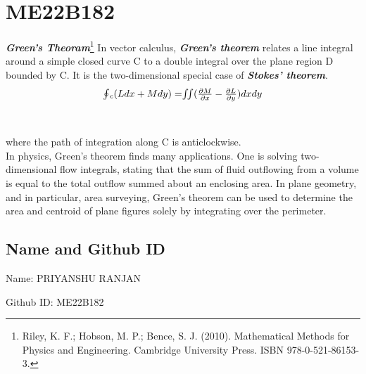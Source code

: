 \section{ME22B182}
 \textbf{\textit{Green's Theoram}}\footnote{ Riley, K. F.; Hobson, M. P.; Bence, S. J. (2010). Mathematical Methods for Physics and Engineering. Cambridge University Press. ISBN 978-0-521-86153-3.}
In vector calculus, \textbf{\textit{Green's theorem}} relates a line integral around a simple closed curve C to a double integral over the plane region D bounded by C. It is the two-dimensional special case of \textbf{\textit{Stokes' theorem}}.\\
\begin{equation}
$$\oint$$_c(L dx + M dy)= $$\iint$$ (\frac{\partial M}{\partial x} - \frac{\partial L}{\partial y})dx dy
\end{equation}\\
\\where the path of integration along C is anticlockwise.\\
In physics, Green's theorem finds many applications. One is solving two-dimensional flow integrals, stating that the sum of fluid outflowing from a volume is equal to the total outflow summed about an enclosing area. In plane geometry, and in particular, area surveying, Green's theorem can be used to determine the area and centroid of plane figures solely by integrating over the perimeter.

\subsection{Name and Github ID}


    \item Name: PRIYANSHU RANJAN
    \item Github ID: ME22B182



